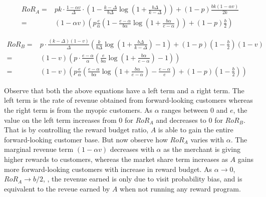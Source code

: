 \begin{align*}
RoR_A =& pk\cdot\frac{1-\alpha v}{\Delta}\cdot\left(1 - \frac{k-\Delta}{b\Delta}\log\left(1+\frac{b\Delta}{k-\Delta}\right)\right) + (1-p)\frac{bk(1-\alpha v)}{2k}\\
      =& (1-\alpha v) \left(p\frac{e}{\alpha}\left(1-\frac{e-\alpha}{b\alpha}\log\left(1+\frac{b\alpha}{e-\alpha}\right)\right) + (1-p)\frac{b}{2}\right)
\end{align*}

\begin{align*}
RoR_B =& p\cdot\frac{(k-\Delta)(1-v)}{\Delta}\left(\frac{k}{b\Delta}\log\left(1+\frac{b\Delta}{k-\Delta}\right) - 1\right) + (1-p)(1-\frac{b}{2})(1-v)\\
      =& (1-v)\left(p\cdot\frac{e-\alpha}{\alpha}\left(\frac{e}{b\alpha}\log\left(1+\frac{b\alpha}{e-\alpha}\right) - 1\right)\right)\\
      =& (1-v)\left(p\frac{e}{\alpha}\left(\frac{e-\alpha}{b\alpha}\log\left(1+\frac{b\alpha}{e-\alpha}\right) - \frac{e-\alpha}{e}\right) + (1-p)(1-\frac{b}{2})\right)
\end{align*}

Observe that both the above equations have a left term and a right term. The left term is the rate of revenue obtained from forward-looking customers whereas the right term is from the myopic customers.
As $\alpha$ ranges between $0$ and $e$, the value on the left term increases from $0$ for $RoR_A$ and decreases to $0$ for $RoR_B$.
That is by controlling the reward budget ratio, $A$ is able to gain the entire forward-looking customer base.
But now observe how $RoR_A$ varies with $\alpha$.
The marginal revenue term $(1-\alpha v)$ decreases with $\alpha$ as the merchant is giving higher rewards to customers, whereas the market share term increases as $A$ gains more forward-looking customers with increase in reward budget.
As $\alpha \to 0$, $RoR_A \to b/2$, \ie, the revenue earned is only due to visit probability bias, and is equivalent to the reveue earned by $A$ when not running any reward program.

